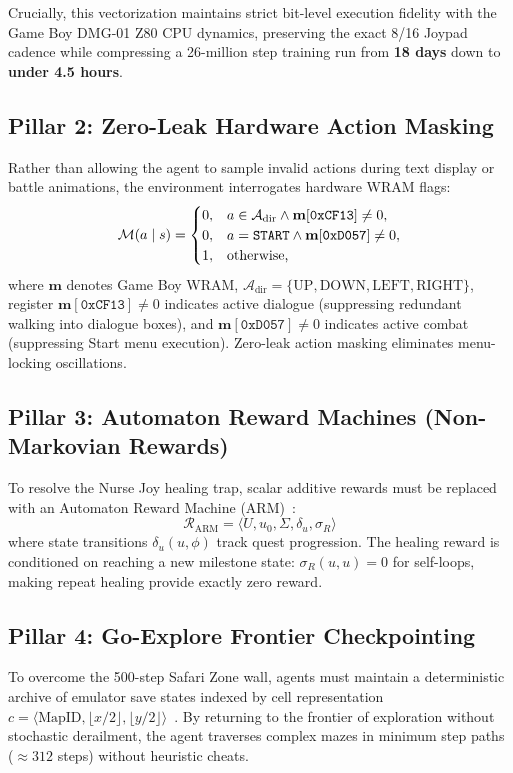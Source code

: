 \documentclass[conference]{IEEEtran}
\begin{document}
Crucially, this vectorization maintains strict bit-level execution fidelity with the Game Boy DMG-01 Z80 CPU dynamics, preserving the exact 8/16 Joypad cadence while compressing a 26-million step training run from \textbf{18 days} down to \textbf{under 4.5 hours}.

\subsection{Pillar 2: Zero-Leak Hardware Action Masking}
Rather than allowing the agent to sample invalid actions during text display or battle animations, the environment interrogates hardware WRAM flags:
\begin{equation}
\label{eq:action_mask}
\mathcal{M}(a \mid s) = \begin{cases}
0, & a \in \mathcal{A}_{\text{dir}} \wedge \mathbf{m}[\texttt{0xCF13}] \neq 0, \\
0, & a = \text{\texttt{START}} \wedge \mathbf{m}[\texttt{0xD057}] \neq 0, \\
1, & \text{otherwise,}
\end{cases}
\end{equation}
where $\mathbf{m}$ denotes Game Boy WRAM, $\mathcal{A}_{\text{dir}} = \{\text{UP}, \text{DOWN}, \text{LEFT}, \text{RIGHT}\}$, register $\mathbf{m}[\texttt{0xCF13}] \ne 0$ indicates active dialogue (suppressing redundant walking into dialogue boxes), and $\mathbf{m}[\texttt{0xD057}] \ne 0$ indicates active combat (suppressing Start menu execution). Zero-leak action masking eliminates menu-locking oscillations.

\subsection{Pillar 3: Automaton Reward Machines (Non-Markovian Rewards)}
To resolve the Nurse Joy healing trap, scalar additive rewards must be replaced with an Automaton Reward Machine (ARM)~\cite{icarte2022reward}:
\begin{equation}
\mathcal{R}_{\text{ARM}} = \langle U, u_0, \Sigma, \delta_u, \sigma_R \rangle
\end{equation}
where state transitions $\delta_u(u, \phi)$ track quest progression. The healing reward is conditioned on reaching a new milestone state: $\sigma_R(u, u) = 0$ for self-loops, making repeat healing provide exactly zero reward.

\subsection{Pillar 4: Go-Explore Frontier Checkpointing}
To overcome the 500-step Safari Zone wall, agents must maintain a deterministic archive of emulator save states indexed by cell representation $c = \langle \text{MapID}, \lfloor x/2 \rfloor, \lfloor y/2 \rfloor \rangle$~\cite{ecoffet2021first}. By returning to the frontier of exploration without stochastic derailment, the agent traverses complex mazes in minimum step paths ($\approx 312$ steps) without heuristic cheats.
\end{document}
